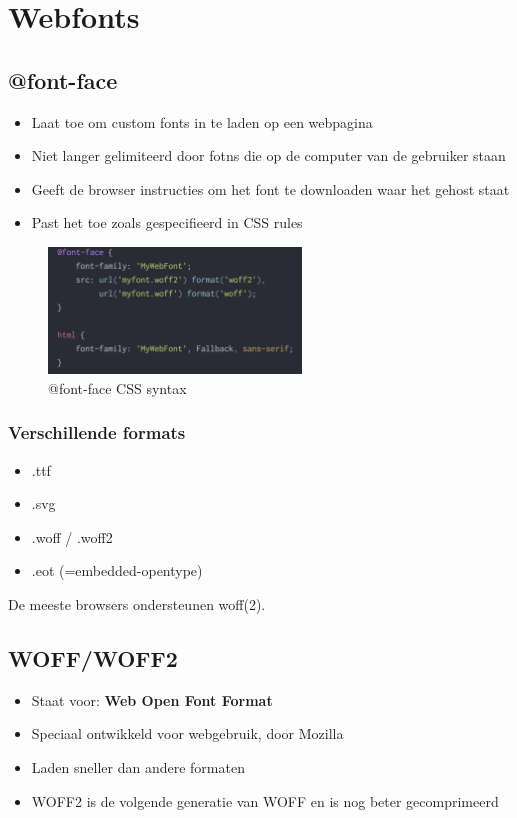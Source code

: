 \documentclass{article}
\newcommand{\bold}[1]{\textbf{#1}}
\begin{document}
\section{Webfonts}

\subsection{@font-face}

\begin{itemize}
    \item Laat toe om custom fonts in te laden op een webpagina
    \item Niet langer gelimiteerd door fotns die op de computer van de gebruiker staan
    \item Geeft de browser instructies om het font te downloaden waar het gehost staat
    \item Past het toe zoals gespecifieerd in CSS rules
\end{itemize}

\begin{figure}[H]
    \centering
    \includegraphics[width=0.6\textwidth]{img/font-faces.png}
    \caption{@font-face CSS syntax}
\end{figure}

\subsubsection{Verschillende formats}

\begin{itemize}
    \item .ttf
    \item .svg
    \item .woff / .woff2
    \item .eot (=embedded-opentype)
\end{itemize}

De meeste browsers ondersteunen woff(2). 

\subsection{WOFF/WOFF2}
\begin{itemize}
    \item Staat voor: \bold{Web Open Font Format}
    \item Speciaal ontwikkeld voor webgebruik, door Mozilla
    \item Laden sneller dan andere formaten
    \item WOFF2 is de volgende generatie van WOFF en is nog beter gecomprimeerd
\end{itemize}
\end{document}
